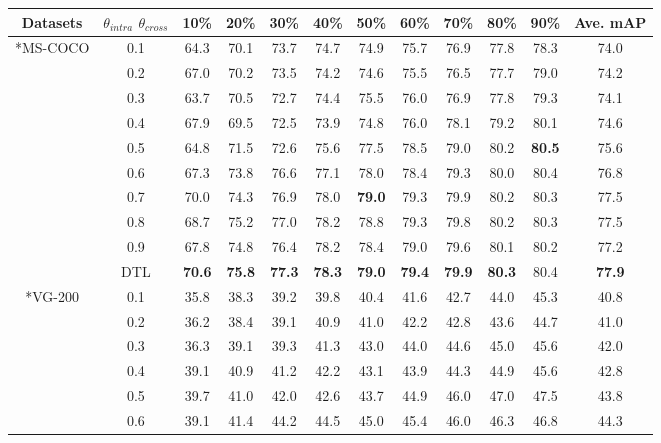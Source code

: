 \begin{table*}[!t]
  \centering
  \small
  \begin{tabular}{c|c|ccccccccc|c}
  \hline
  \centering Datasets & $\theta_{intra}$ $\theta_{cross}$ & 10\% & 20\% & 30\% & 40\% & 50\% & 60\% & 70\% & 80\% & 90\% & Ave. mAP \\
  \hline
  \hline
  \centering \multirow{9}*{MS-COCO} & 0.1 & 64.3 & 70.1 & 73.7 & 74.7 & 74.9 & 75.7 & 76.9 & 77.8 & 78.3 & 74.0 \\
  \centering ~ & 0.2 & 67.0 & 70.2 & 73.5 & 74.2 & 74.6 & 75.5 & 76.5 & 77.7 & 79.0 & 74.2 \\
  \centering ~ & 0.3 & 63.7 & 70.5 & 72.7 & 74.4 & 75.5 & 76.0 & 76.9 & 77.8 & 79.3 & 74.1 \\
  \centering ~ & 0.4 & 67.9 & 69.5 & 72.5 & 73.9 & 74.8 & 76.0 & 78.1 & 79.2 & 80.1 & 74.6 \\
  \centering ~ & 0.5 & 64.8 & 71.5 & 72.6 & 75.6 & 77.5 & 78.5 & 79.0 & 80.2 & \textbf{80.5} & 75.6 \\
  \centering ~ & 0.6 & 67.3 & 73.8 & 76.6 & 77.1 & 78.0 & 78.4 & 79.3 & 80.0 & 80.4 & 76.8 \\
  \centering ~ & 0.7 & 70.0 & 74.3 & 76.9 & 78.0 & \textbf{79.0} & 79.3 & 79.9 & 80.2 & 80.3 & 77.5 \\
  \centering ~ & 0.8 & 68.7 & 75.2 & 77.0 & 78.2 & 78.8 & 79.3 & 79.8 & 80.2 & 80.3 & 77.5 \\
  \centering ~ & 0.9 & 67.8 & 74.8 & 76.4 & 78.2 & 78.4 & 79.0 & 79.6 & 80.1 & 80.2 & 77.2 \\
  \hline
  \centering ~ & DTL & \textbf{70.6} & \textbf{75.8} & \textbf{77.3} & \textbf{78.3} & \textbf{79.0} & \textbf{79.4} & \textbf{79.9} & \textbf{80.3} & 80.4 & \textbf{77.9} \\
  \hline
  \hline
  \centering \multirow{9}*{VG-200} & 0.1 & 35.8 & 38.3 & 39.2 & 39.8 & 40.4 & 41.6 & 42.7 & 44.0 & 45.3 & 40.8 \\
  \centering ~ & 0.2 & 36.2 & 38.4 & 39.1 & 40.9 & 41.0 & 42.2 & 42.8 & 43.6 & 44.7 & 41.0 \\
  \centering ~ & 0.3 & 36.3 & 39.1 & 39.3 & 41.3 & 43.0 & 44.0 & 44.6 & 45.0 & 45.6 & 42.0 \\
  \centering ~ & 0.4 & 39.1 & 40.9 & 41.2 & 42.2 & 43.1 & 43.9 & 44.3 & 44.9 & 45.6 & 42.8 \\
  \centering ~ & 0.5 & 39.7 & 41.0 & 42.0 & 42.6 & 43.7 & 44.9 & 46.0 & 47.0 & 47.5 & 43.8 \\
  \centering ~ & 0.6 & 39.1 & 41.4 & 44.2 & 44.5 & 45.0 & 45.4 & 46.0 & 46.3 & 46.8 & 44.3 \\

\end{tabular}
\end{table*}
